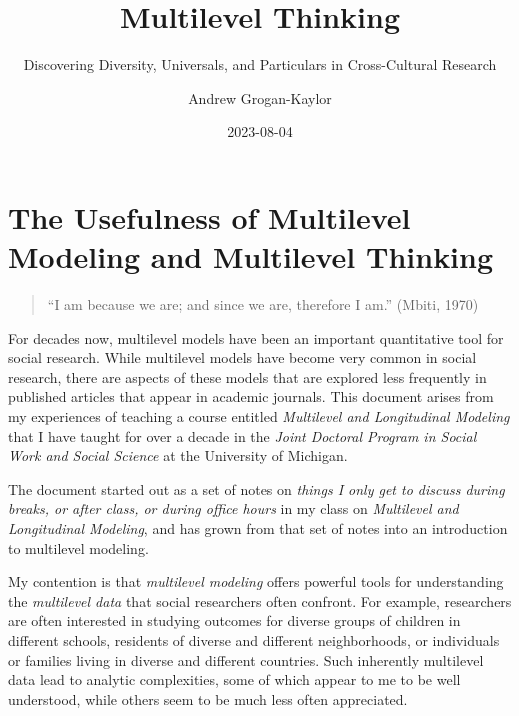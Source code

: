 \documentclass[
  letterpaper,
  DIV=11,
  numbers=noendperiod]{scrreprt}
\title{Multilevel Thinking}
\subtitle{Discovering Diversity, Universals, and Particulars in
Cross-Cultural Research}
\author{Andrew Grogan-Kaylor}
\date{2023-08-04}
\renewcommand*\contentsname{Table of contents}
\newcommand\contentsname{Table of contents}
\begin{document}
\maketitle
\ifdefined\Shaded\renewenvironment{Shaded}{\begin{tcolorbox}[borderline west={3pt}{0pt}{shadecolor}, enhanced, interior hidden, sharp corners, boxrule=0pt, frame hidden, breakable]}{\end{tcolorbox}}\fi

\renewcommand*\contentsname{Table of contents}
{
\hypersetup{linkcolor=}
\setcounter{tocdepth}{2}
\tableofcontents
}
\listoffigures
\listoftables
{}

\hypertarget{the-usefulness-of-multilevel-modeling-and-multilevel-thinking}{%
\chapter{The Usefulness of Multilevel Modeling and Multilevel
Thinking}\label{the-usefulness-of-multilevel-modeling-and-multilevel-thinking}}

\begin{quote}
``I am because we are; and since we are, therefore I am.'' (Mbiti, 1970)
\end{quote}

For decades now, multilevel models have been an important quantitative
tool for social research. While multilevel models have become very
common in social research, there are aspects of these models that are
explored less frequently in published articles that appear in academic
journals. This document arises from my experiences of teaching a course
entitled \emph{Multilevel and Longitudinal Modeling} that I have taught
for over a decade in the \emph{Joint Doctoral Program in Social Work and
Social Science} at the University of Michigan.

The document started out as a set of notes on \emph{things I only get to
discuss during breaks, or after class, or during office hours} in my
class on \emph{Multilevel and Longitudinal Modeling}, and has grown from
that set of notes into an introduction to multilevel modeling.

My contention is that \emph{multilevel modeling} offers powerful tools
for understanding the \emph{multilevel data} that social researchers
often confront. For example, researchers are often interested in
studying outcomes for diverse groups of children in different schools,
residents of diverse and different neighborhoods, or individuals or
families living in diverse and different countries. Such inherently
multilevel data lead to analytic complexities, some of which appear to
me to be well understood, while others seem to be much less often
appreciated.
\end{document}
